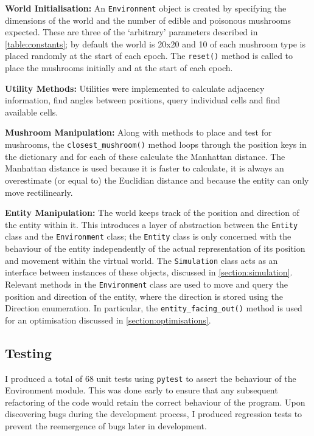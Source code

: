 \documentclass[12pt,a4paper]{report}
\begin{document}
{\bf World Initialisation:} An \texttt{Environment} object is created by specifying the dimensions of the world and the number of edible and poisonous mushrooms expected. These are three of the `arbitrary' parameters described in \cref{table:constants}; by default the world is 20x20 and 10 of each mushroom type is placed randomly at the start of each epoch. The \texttt{reset()} method is called to place the mushrooms initially and at the start of each epoch.

{\bf Utility Methods:} Utilities were implemented to calculate adjacency information, find angles between positions, query individual cells and find available cells.

{\bf Mushroom Manipulation:} Along with methods to place and test for mushrooms, the \texttt{closest\_mushroom()} method loops through the position keys in the dictionary and for each of these calculate the Manhattan distance. The Manhattan distance is used because it is faster to calculate, it is always an overestimate (or equal to) the Euclidian distance and because the entity can only move rectilinearly.

{\bf Entity Manipulation:} The world keeps track of the position and direction of the entity within it. This introduces a layer of abstraction between the \texttt{Entity} class and the \texttt{Environment} class; the \texttt{Entity} class is only concerned with the behaviour of the entity independently of the actual representation of its position and movement within the virtual world. The \texttt{Simulation} class acts as an interface between instances of these objects, discussed in \cref{section:simulation}. Relevant methods in the \texttt{Environment} class are used to move and query the position and direction of the entity, where the direction is stored using the Direction enumeration. In particular, the \texttt{entity\_facing\_out()} method is used for an optimisation discussed in \cref{section:optimisations}.

\subsection{Testing}

I produced a total of 68 unit tests using \texttt{pytest} to assert the behaviour of the Environment module. This was done early to ensure that any subsequent refactoring of the code would retain the correct behaviour of the program. Upon discovering bugs during the development process, I produced regression tests to prevent the reemergence of bugs later in development. 
\end{document}
